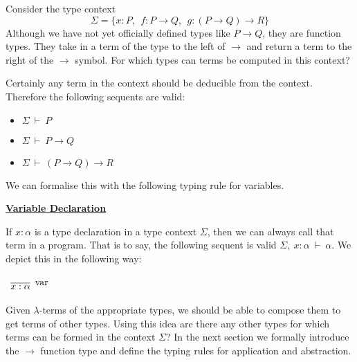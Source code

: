 \documentclass{book}
\begin{document}
    \begin{eg}
        
        Consider the type context $$\Sigma = \{x : P, \ \ f : P \to Q, \ \ g : (P \to Q) \to R\}$$ Although we have not yet officially defined types like $P \to Q$, they are function types. They take in a term of the type to the left of $\to$ and return a term to the right of the $\to$ symbol. For which types can terms be computed in this context?

        Certainly any term in the context should be deducible from the context. Therefore the following sequents are valid: 

        \begin{itemize}
            \item[] $\Sigma \ \vdash \ P$
            \item[] $\Sigma \ \vdash \ P \to Q$
            \item[] $\Sigma \ \vdash \ (P \to Q) \to R$
        \end{itemize}

        We can formalise this with the following typing rule for variables.

        \begin{mdframed}

            \underline{{\bf Variable Declaration}}
            
            If $x : \alpha$ is a type declaration in a type context $\Sigma$, then we can always call that term in a program. That is to say, the following sequent is valid $\Sigma, \ x : \alpha \ \vdash \ \alpha$. We depict this in the following way:
          
            \begin{center}
              $\begin{array}{c}
                  \infer[\var]{x : \alpha}{\vspace{0.2cm}}
              \end{array}$
            \end{center}
        \end{mdframed}

        Given $\lambda$-terms of the appropriate types, we should be able to compose them to get terms of other types. Using this idea are there any other types for which terms can be formed in the context $\Sigma$? In the next section we formally introduce the $\to$ function type and define the typing rules for application and abstraction. 

    \end{eg}
    
\end{document}
